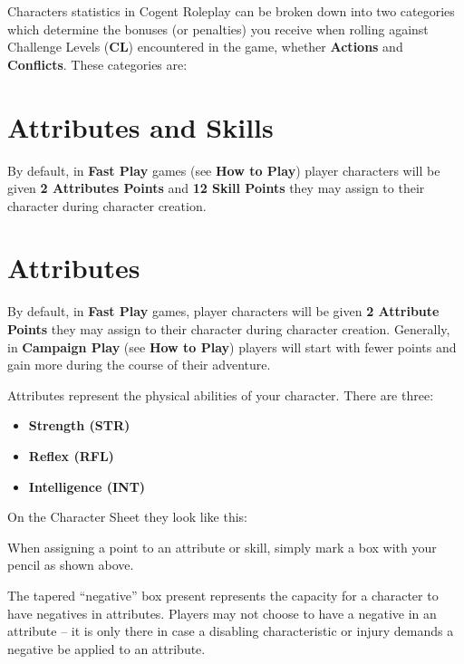 Characters statistics in Cogent Roleplay can be broken down into two categories which determine the bonuses (or penalties) you receive when rolling against Challenge Levels (\textbf{CL}) encountered in the game, whether \textbf{Actions} and \textbf{Conflicts}. These categories are:

\section{Attributes and Skills} \label{sec:attributes_and_skills}

By default, in \textbf{Fast Play} games (see \textbf{How to Play}) player characters will be given \textbf{2 Attributes Points} and \textbf{12 Skill Points} they may assign to their character during character creation.

\section{Attributes} \label{sec:attributes}

By default, in \textbf{Fast Play }games, player characters will be given \textbf{2 Attribute Points} they may assign to their character during character creation.  Generally, in \textbf{Campaign Play} (see \textbf{How to Play}) players will start with fewer points and gain more during the course of their adventure.

Attributes represent the physical abilities of your character.  There are three:

\begin{itemize}
    \item \textbf{Strength (STR)}
    \item \textbf{Reflex (RFL)}
    \item \textbf{Intelligence (INT)}
\end{itemize}

On the Character Sheet they look like this:



When assigning a point to an attribute or skill, simply mark a box with your pencil as shown above.

The tapered “negative” box present represents the capacity for a character to have negatives in attributes. Players may not choose to have a negative in an attribute – it is only there in case a disabling characteristic or injury demands a negative be applied to an attribute.

